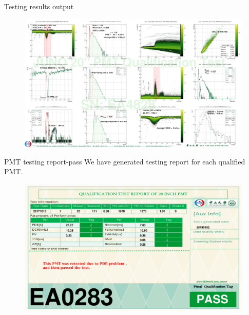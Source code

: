 \documentclass[11pt,compress,xcolor=x11names,UTF8]{beamer}
\begin{document}
\begin{frame}{Testing results output}
\begin{figure}
\centering
\includegraphics[width=1.0\textwidth]{figures/sys1_mass10244_channel122_snEA4828_lt2.png}
\end{figure}
\end{frame}
\begin{frame}{PMT testing report-pass}
We have generated testing report for each qualified PMT.
\vspace{-.2cm}
\begin{figure}
\centering
\includegraphics[width=1.0\textwidth]{figures/SN_EA0283_pde1_dcr1_HV1_pv1_rt1_tag1.png}
\end{figure}
\end{frame}
\end{document}
